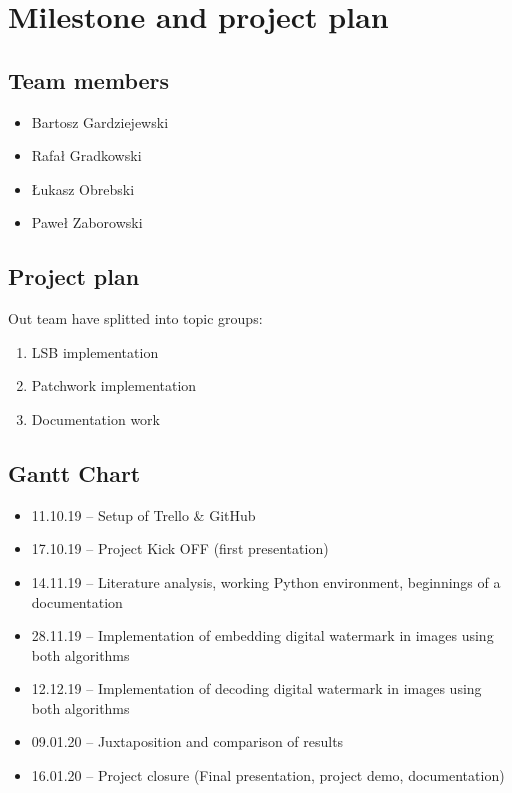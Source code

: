 \documentclass[a4paper, 12pt]{article}
\begin{document}
\section{Milestone and project plan}

	\subsection{Team members}
	
	\begin{itemize}
		\item Bartosz Gardziejewski
		\item Rafał Gradkowski
		\item Łukasz Obrebski
		\item Paweł Zaborowski
	\end{itemize}

	\subsection{Project plan}
	
	Out team have splitted into topic groups:
	
	\begin{enumerate}
		\item LSB implementation
		\item Patchwork implementation
		\item Documentation work
	\end{enumerate}
	

	\subsection{Gantt Chart}
	
	\begin{itemize}
	

	\item 11.10.19 – Setup of Trello \& GitHub
	\item 17.10.19 – Project Kick OFF (first presentation)
	\item 14.11.19 – Literature analysis, working Python environment, beginnings of a documentation
	\item 28.11.19 – Implementation of embedding digital watermark in images using both algorithms
	\item 12.12.19 – Implementation of decoding digital watermark in images using both algorithms
	\item 09.01.20 – Juxtaposition and comparison of results
	\item 16.01.20 – Project closure (Final presentation, project demo, documentation)
	\end{itemize}
	
\end{document}

